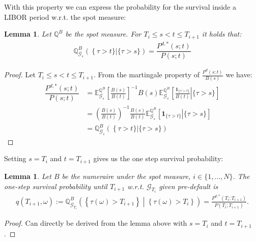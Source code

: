 \documentclass[12pt]{article}
\newtheorem{lemma}[theorem]{Lemma}
\begin{document}
	With this property we can express the probability for the survival inside a LIBOR period w.r.t. the spot measure:
	\begin{lemma}
		Let $\mathbb{Q}^B$ be the spot measure. For $T_i \le s < t \le T_{i+1}$ it holds that:
		\begin{align*}
			\mathbb{Q}^B_{\mathcal{G}_s}\left(\left  \{\tau > t\} \right| \{\tau > s\}\right) = \dfrac{P^{d,*}(s;t)}{P(s;t)}
		\end{align*}
	\end{lemma}
	\begin{proof}
		Let $T_i \le s < t \le T_{i+1}$. From the martingale property of $\frac{P^{d}(s;t)}{B(s)}$ we have:
		\begin{align*}
				\dfrac{P^{d,*}(s;t)}{P(s;t)} &= \mathbb{E}^{\mathbb{Q}^B}_{\mathcal{G}_{s}}\left[\frac{B(s)}{B(t)}\right]^{-1} B(s)\mathbb{E}^{\mathbb{Q}^B}_{\mathcal{G}_{s}}\left[\left.\frac{\mathbf{1}_{\{\tau > t\}}}{B(t)} \right| \{\tau> s\}\right]\\
				&= \left(\frac{B(s)}{B(t)}\right)^{-1} \frac{B(s)}{B(t)} \mathbb{E}^{\mathbb{Q}^B}_{\mathcal{G}_{s}}\left[ \left. \mathbf{1}_{\{\tau > t\}} \right| \{\tau> s\} \right]\\
				&= \mathbb{Q}^B_{\mathcal{G}_s}\left(\left  \{\tau > t\} \right| \{\tau > s\}\right)
		\end{align*}
	\end{proof}
	Setting $s=T_i$ and $t=T_{i+1}$ gives us the one step survival probability:
	\begin{lemma}
		Let $B$ be the numeraire under the spot measure, $i \in \{1, ..., N\}$.
		The one-step survival probability until $T_{i+1}$ w.r.t. $\mathcal{G}_{T_i}$ given pre-default is
		\begin{align}
			q(T_{i+1}, \omega) := \mathbb{Q}^B_{\mathcal{G}_{T_i}}\left( \left.\left\{\tau(\omega) > T_{i+1} \right\}  \;\right|\; \left\{\tau(\omega) > T_{i} \right\} \right) = \frac{P^{d,*}(T_i;T_{i+1})}{P(T_i;T_{i+1})}. \label{eq:oneStepSProbwrtF}
		\end{align}
	\end{lemma}
	\begin{proof}
		Can directly be derived from the lemma above with $s=T_i$ and $t=T_{i+1}$.
	\end{proof}
	
	
	
	
	
\end{document}
